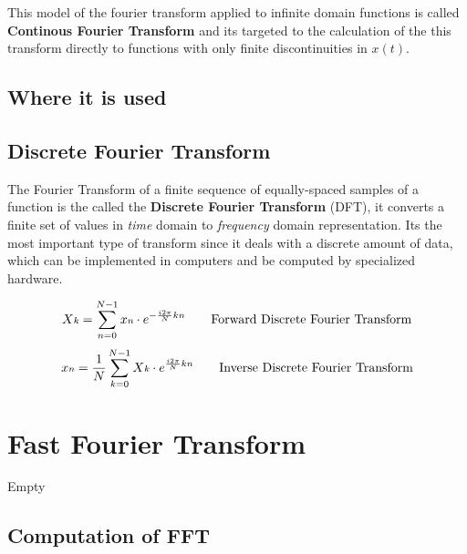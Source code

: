 \documentclass[
  oneside,
  11pt, a4paper,
  footinclude=true,
  headinclude=true,
  cleardoublepage=empty
]{scrbook}
\newcommand{\eqname}[1]{\tag*{#1}}%
\begin{document}

This model of the fourier transform applied to infinite domain functions is called \textbf{Continous Fourier Transform} and its targeted to the calculation of the this transform directly to functions with only finite discontinuities in \( x(t) \).

\subsection{Where it is used}
\subsection{Discrete Fourier Transform}

The Fourier Transform of a finite sequence of equally-spaced samples of a function is the called the \textbf{Discrete Fourier Transform} (DFT), it converts a finite set of values in \textit{time} domain to \textit{frequency} domain representation. Its the most important type of transform since it deals with a discrete amount of data, which can be implemented in computers and be computed by specialized hardware.

\begin{equation} \label{eq3}
    X{\scriptstyle k} = \sum_{n=0}^{N-1}x{\scriptstyle n} \cdot e^{- \frac{i 2 \pi}{N}kn} \\ \eqname{Forward Discrete Fourier Transform} \\
\end{equation}
\begin{equation} \label{eq4}
    x{\scriptstyle n} = \frac{1}{N} \sum_{k=0}^{N-1}X{\scriptstyle k} \cdot e^{\frac{i 2 \pi}{N}kn} \\ \eqname{Inverse Discrete Fourier Transform} \\
\end{equation}


\section{Fast Fourier Transform}

Empty

\subsection{Computation of FFT}
\end{document}
